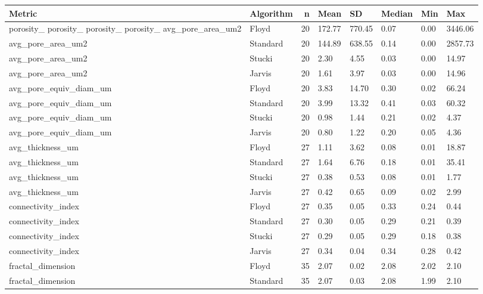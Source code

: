 \begin{tabular}{llrlllll}
\toprule
Metric & Algorithm & n & Mean & SD & Median & Min & Max \\
\midrule
porosity_%
porosity_%
porosity_%
porosity_%
avg_pore_area_um2 & Floyd & 20 & 172.77 & 770.45 & 0.07 & 0.00 & 3446.06 \\
avg_pore_area_um2 & Standard & 20 & 144.89 & 638.55 & 0.14 & 0.00 & 2857.73 \\
avg_pore_area_um2 & Stucki & 20 & 2.30 & 4.55 & 0.03 & 0.00 & 14.97 \\
avg_pore_area_um2 & Jarvis & 20 & 1.61 & 3.97 & 0.03 & 0.00 & 14.96 \\
avg_pore_equiv_diam_um & Floyd & 20 & 3.83 & 14.70 & 0.30 & 0.02 & 66.24 \\
avg_pore_equiv_diam_um & Standard & 20 & 3.99 & 13.32 & 0.41 & 0.03 & 60.32 \\
avg_pore_equiv_diam_um & Stucki & 20 & 0.98 & 1.44 & 0.21 & 0.02 & 4.37 \\
avg_pore_equiv_diam_um & Jarvis & 20 & 0.80 & 1.22 & 0.20 & 0.05 & 4.36 \\
avg_thickness_um & Floyd & 27 & 1.11 & 3.62 & 0.08 & 0.01 & 18.87 \\
avg_thickness_um & Standard & 27 & 1.64 & 6.76 & 0.18 & 0.01 & 35.41 \\
avg_thickness_um & Stucki & 27 & 0.38 & 0.53 & 0.08 & 0.01 & 1.77 \\
avg_thickness_um & Jarvis & 27 & 0.42 & 0.65 & 0.09 & 0.02 & 2.99 \\
connectivity_index & Floyd & 27 & 0.35 & 0.05 & 0.33 & 0.24 & 0.44 \\
connectivity_index & Standard & 27 & 0.30 & 0.05 & 0.29 & 0.21 & 0.39 \\
connectivity_index & Stucki & 27 & 0.29 & 0.05 & 0.29 & 0.18 & 0.38 \\
connectivity_index & Jarvis & 27 & 0.34 & 0.04 & 0.34 & 0.28 & 0.42 \\
fractal_dimension & Floyd & 35 & 2.07 & 0.02 & 2.08 & 2.02 & 2.10 \\
fractal_dimension & Standard & 35 & 2.07 & 0.03 & 2.08 & 1.99 & 2.10 \\

\end{tabular}
